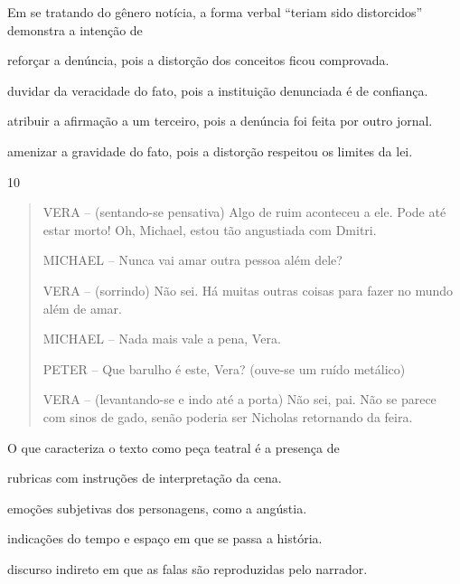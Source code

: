 Em se tratando do gênero notícia, a forma verbal ``teriam sido
distorcidos'' demonstra a intenção de

\begin{escolha}
\item reforçar a denúncia, pois a distorção dos conceitos ficou comprovada.

\item duvidar da veracidade do fato, pois a instituição denunciada é de
confiança.

\item atribuir a afirmação a um terceiro, pois a denúncia foi feita por
outro jornal.

\item amenizar a gravidade do fato, pois a distorção respeitou os limites
da lei.
\end{escolha}

\num{10}

\begin{quote}
VERA -- (sentando-se pensativa) Algo de ruim aconteceu a ele. Pode até
estar morto! Oh, Michael, estou tão angustiada com Dmitri.

MICHAEL -- Nunca vai amar outra pessoa além dele?

VERA -- (sorrindo) Não sei. Há muitas outras coisas para fazer no mundo
além de amar.

MICHAEL -- Nada mais vale a pena, Vera.

PETER -- Que barulho é este, Vera? (ouve-se um ruído metálico)

VERA -- (levantando-se e indo até a porta) Não sei, pai. Não se parece
com sinos de gado, senão poderia ser Nicholas retornando da feira.
\end{quote}


O que caracteriza o texto como peça teatral é a presença de

\begin{escolha}
\item rubricas com instruções de interpretação da cena.

\item emoções subjetivas dos personagens, como a angústia.

\item indicações do tempo e espaço em que se passa a história.

\item discurso indireto em que as falas são reproduzidas pelo narrador.
\end{escolha}

